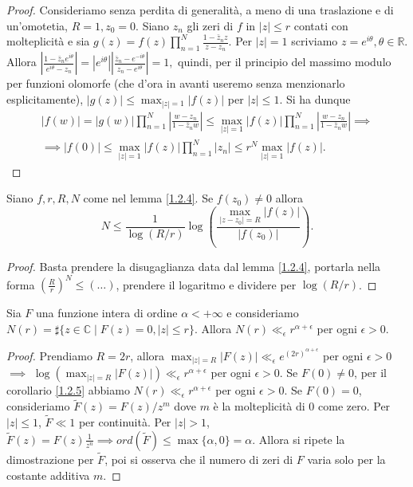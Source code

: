\begin{proof}
  Consideriamo senza perdita di generalità, a meno di una traslazione e di un'omotetia, $R=1,z_0=0$. Siano $z_n$ gli zeri di $f$ in $|z| \le r$ contati con molteplicità e sia $\displaystyle g(z)=f(z)\prod_{n=1}^N \frac{1-\bar{z}_nz}{z-z_n}$. Per $|z|=1$ scriviamo $z=e^{i\theta},\theta \in \mathbb{R}$.
  Allora $\displaystyle \left|\frac{1-\bar{z}_ne^{i\theta}}{e^{i\theta}-z_n}\right|=|e^{i\theta}|\left|\frac{\bar{z}_n-e^{-i\theta}}{z_n-e^{i\theta}}\right|=1,$ quindi, per il principio del massimo modulo per funzioni olomorfe (che d'ora in avanti useremo senza menzionarlo esplicitamente), $\displaystyle |g(z)| \le \max_{|z|=1} |f(z)|$ per $|z| \le 1$. Si ha dunque
  \begin{gather*}
    |f(w)|=|g(w)|\prod_{n=1}^N\left|\frac{w-z_n}{1-\bar{z}_nw}\right| \le \max_{|z|=1} |f(z)| \prod_{n=1}^N \left|\frac{w-z_n}{1-\bar{z}_nw}\right| \implies \\
    \implies |f(0)| \le \max_{|z|=1} |f(z)| \prod_{n=1}^N |z_n| \le r^N \max_{|z|=1} |f(z)|.
  \end{gather*}
\end{proof}

\begin{cor} \label{1.2.5}
  Siano $f, r, R, N$ come nel lemma \ref{1.2.4}. Se $f(z_0)\not=0$ allora
  $$N \le \frac{1}{\log(R/r)}\log\left(\frac{\max_{|z-z_0|=R}|f(z)|}{|f(z_0)|}\right).$$
\end{cor}

\begin{proof}
  Basta prendere la disugaglianza data dal lemma \ref{1.2.4}, portarla nella forma $\left(\frac{R}{r}\right)^N \le (\dots)$, prendere il logaritmo e dividere per $\log(R/r)$.
\end{proof}

\begin{thm} \label{1.2.6}
  Sia $F$ una funzione intera di ordine $\alpha<+\infty$ e consideriamo $N(r)=\sharp\{z \in \mathbb{C} \mid F(z)=0, |z| \le r\}$. Allora $N(r) \ll_{\epsilon} r^{\alpha+\epsilon}$ per ogni $\epsilon>0$.
\end{thm}

\begin{proof}
  Prendiamo $R=2r$, allora $\displaystyle \max_{|z|=R}|F(z)| \ll_{\epsilon} e^{(2r)^{\alpha+\epsilon}}$ per ogni $\epsilon>0$ $\implies$ $\displaystyle \log\left(\max_{|z|=R}|F(z)|\right) \ll_{\epsilon} r^{\alpha+\epsilon}$ per ogni $\epsilon>0$.
  Se $F(0)\not=0$, per il corollario \ref{1.2.5} abbiamo $N(r) \ll_{\epsilon} r^{\alpha+\epsilon}$ per ogni $\epsilon>0$. Se $F(0)=0$, consideriamo $\tilde{F}(z)=F(z)/z^m$ dove $m$ è la molteplicità di $0$ come zero. Per $|z| \le 1$, $\tilde{F} \ll 1$ per continuità.
  Per $|z|>1$, $\tilde{F}(z)=F(z)\frac{1}{z^n} \implies ord(\tilde{F}) \le \max\{\alpha,0\}=\alpha$. Allora si ripete la dimostrazione per $\tilde{F}$, poi si osserva che il numero di zeri di $F$ varia solo per la costante additiva $m$.
\end{proof}

